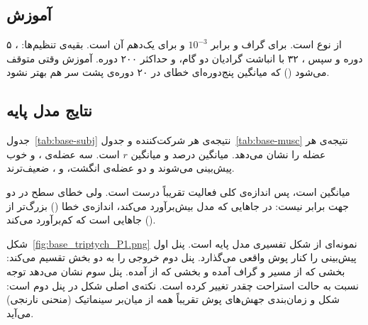 \subsection{آموزش}

 از نوع  است.  برای گراف و  برابر $10^{-3}$ و برای  یک‌دهم آن است. بقیه‌ی تنظیم‌ها:  ، ۵ دوره  و سپس ،  ۳۲ با انباشت گرادیان دو گام،  و حداکثر ۲۰۰ دوره. آموزش وقتی متوقف می‌شود () که میانگین پنج‌دوره‌ای خطای  در ۲۰ دوره‌ی پشت سر هم بهتر نشود.

\subsection{نتایج مدل پایه}

جدول~\ref{tab:base-subj} نتیجه‌ی هر شرکت‌کننده و جدول~\ref{tab:base-musc} نتیجه‌ی هر عضله را نشان می‌دهد. میانگین   درصد و میانگین $r$  است. سه عضله‌ی ،  و  خوب پیش‌بینی می‌شوند و دو عضله‌ی انگشت،  و ، ضعیف‌ترند.

میانگین   است، پس اندازه‌ی کلی فعالیت تقریباً درست است. ولی خطای سطح در دو جهت برابر نیست: در جاهایی که مدل بیش‌برآورد می‌کند، اندازه‌ی خطا () بزرگ‌تر از جاهایی است که کم‌برآورد می‌کند ().




شکل~\ref{fig:base_triptych_P1.png} نمونه‌ای از شکل تفسیری مدل پایه است. پنل اول پیش‌بینی را کنار پوش واقعی می‌گذارد. پنل دوم خروجی را به دو بخش تقسیم می‌کند: بخشی که از مسیر  و گراف آمده و بخشی که از  آمده. پنل سوم نشان می‌دهد توجه  نسبت به حالت استراحت چقدر تغییر کرده است. نکته‌ی اصلی شکل در پنل دوم است: شکل و زمان‌بندی جهش‌های پوش تقریباً همه از میان‌بر سینماتیک (منحنی نارنجی) می‌آید.



